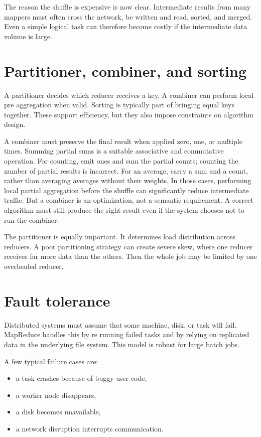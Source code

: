 \documentclass[11pt,a4paper,openany]{book}
\begin{document}
The reason the shuffle is expensive is now clear. Intermediate results from many mappers must often cross the network, be written and read, sorted, and merged. Even a simple logical task can therefore become costly if the intermediate data volume is large.

\section{Partitioner, combiner, and sorting}
A partitioner decides which reducer receives a key. A combiner can perform local pre aggregation when valid. Sorting is typically part of bringing equal keys together. These support efficiency, but they also impose constraints on algorithm design.

A combiner must preserve the final result when applied zero, one, or multiple times. Summing partial sums is a suitable associative and commutative operation. For counting, emit ones and sum the partial counts; counting the number of partial results is incorrect. For an average, carry a sum and a count, rather than averaging averages without their weights. In those cases, performing local partial aggregation before the shuffle can significantly reduce intermediate traffic. But a combiner is an optimization, not a semantic requirement. A correct algorithm must still produce the right result even if the system chooses not to run the combiner.

The partitioner is equally important. It determines load distribution across reducers. A poor partitioning strategy can create severe skew, where one reducer receives far more data than the others. Then the whole job may be limited by one overloaded reducer.

\section{Fault tolerance}
Distributed systems must assume that some machine, disk, or task will fail. MapReduce handles this by re running failed tasks and by relying on replicated data in the underlying file system. This model is robust for large batch jobs.

A few typical failure cases are:
\begin{itemize}
\item a task crashes because of buggy user code,
\item a worker node disappears,
\item a disk becomes unavailable,
\item a network disruption interrupts communication.
\end{itemize}
\end{document}
